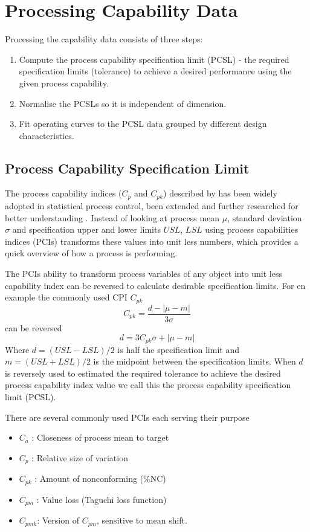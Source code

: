 \documentclass[aip,amsmath, reprint, author-year]{revtex4-1}
\begin{document}
\section{Processing Capability Data}

Processing the capability data consists of three steps: 

\begin{enumerate}
	\item Compute the process capability specification limit (PCSL) - the required specification limits (tolerance) to achieve a desired performance using the given process capability.
	\item Normalise the PCSLs so it is independent of dimension.
	\item Fit operating curves to the PCSL data grouped by different design characteristics.
\end{enumerate}

\subsection{Process Capability Specification Limit}
The process capability indices ($C_p$ and $C_{pk}$) described by \cite{kane1986process} has been widely adopted in statistical process control, been extended and further researched for better understanding \citep{wu2009overview}. 
Instead of looking at process mean $\mu$, standard deviation $\sigma$ and specification upper and lower limits $USL$, $LSL$ using process capabilities indices (PCIs) transforms these values into unit less numbers, which provides a quick overview of how a process is performing.

The PCIs ability to transform process variables of any object into unit less capability index can be reversed to calculate desirable specification limits. For en example the commonly used CPI $C_{pk}$ 
\begin{equation}
	C_{pk} = \frac{d - | \mu - m|}{3 \sigma} \nonumber
\end{equation}
can be reversed
\begin{equation}
	d = 3 C_{pk} \sigma + | \mu - m|
\end{equation}
Where $d = (USL - LSL) / 2$ is half the specification limit and $m = (USL + LSL) / 2$ is the midpoint between the specification limits. When $d$ is reversely used to estimated the required tolerance to achieve the desired process capability index value we call this the process capability specification limit (PCSL). 

There are several commonly used PCIs each serving their purpose \citep{wu2009overview, taguchi1986introduction}
\begin{itemize}
	\item $C_a$ : Closeness of process mean to target 
	\item $C_p$ : Relative size of variation
	\item $C_{pk}$ : Amount of nonconforming (\%NC)
	\item $C_{pm}$ : Value loss (Taguchi loss function)
	\item $C_{pmk}$: Version of $C_{pm}$,  sensitive to mean shift. 
\end{itemize}
\end{document}
